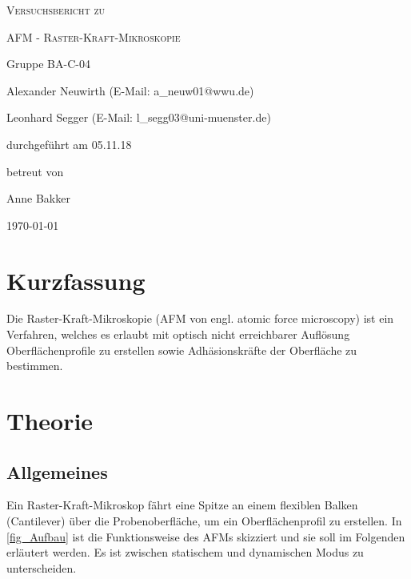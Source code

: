 \documentclass[
	a4paper,
	12pt,
	pagesize,
	ngerman
]{scrartcl}
\begin{document}
	\begin{titlepage}
		\centering
		{\scshape\LARGE Versuchsbericht zu \par}
		\vspace{1cm}
		{\scshape\huge AFM - Raster-Kraft-Mikroskopie \par}
		\vspace{2.5cm}
		{\LARGE Gruppe BA-C-04 \par}
		\vspace{0.5cm}

		{\large Alexander Neuwirth (E-Mail: a\_neuw01@wwu.de) \par}
		{\large Leonhard Segger (E-Mail: l\_segg03@uni-muenster.de) \par}
		\vfill

		durchgeführt am 05.11.18\par
		betreut von\par
		{\large Anne Bakker}

		\vfill

		{\large \today\par}
	\end{titlepage}
	\tableofcontents
	\newpage


	\section{Kurzfassung}
	Die Raster-Kraft-Mikroskopie (AFM von engl. atomic force microscopy) ist ein Verfahren, welches es erlaubt mit optisch nicht erreichbarer Auflösung Oberflächenprofile zu erstellen sowie Adhäsionskräfte der Oberfläche zu bestimmen. %

	\section{Theorie}
	\label{sec_theorie}

	\subsection{Allgemeines}
	Ein Raster-Kraft-Mikroskop fährt eine Spitze an einem flexiblen Balken (Cantilever) über die Probenoberfläche, um ein Oberflächenprofil zu erstellen.
	In \cref{fig_Aufbau} ist die Funktionsweise des AFMs skizziert und sie soll im Folgenden erläutert werden.
	Es ist zwischen statischem und dynamischen Modus zu unterscheiden.
\end{document}
